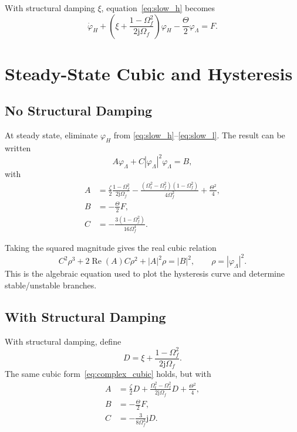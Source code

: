 \documentclass[11pt]{article}
\newcommand{\jj}{\mathrm{j}}
\begin{document}
With structural damping $\xi$, equation~\eqref{eq:slow_h} becomes
\begin{equation}
  \dot\varphi_H
  +\left(\xi+\frac{1-\Omega_f^2}{2\jj\Omega_f}\right)\varphi_H
  -\frac{\Theta}{2}\varphi_\Lambda
  =F.
  \label{eq:slow_h_damped}
\end{equation}

\section{Steady-State Cubic and Hysteresis}

\subsection{No Structural Damping}

At steady state, eliminate $\varphi_H$ from
\eqref{eq:slow_h}--\eqref{eq:slow_l}.  The result can be written
\begin{equation}
  A\varphi_\Lambda+C|\varphi_\Lambda|^2\varphi_\Lambda=B,
  \label{eq:complex_cubic}
\end{equation}
with
\begin{align}
  A
  &=
  \frac{\zeta}{2}\frac{1-\Omega_f^2}{2\jj\Omega_f}
  -\frac{(\Omega_t^2-\Omega_f^2)(1-\Omega_f^2)}{4\Omega_f^2}
  +\frac{\Theta^2}{4},\\
  B&=-\frac{\Theta}{2}F,\\
  C&=-\frac{3(1-\Omega_f^2)}{16\Omega_f^4}.
\end{align}

Taking the squared magnitude gives the real cubic relation
\begin{equation}
  C^2\rho^3
  +2\operatorname{Re}(A)C\rho^2
  +|A|^2\rho
  =
  |B|^2,
  \qquad
  \rho=|\varphi_\Lambda|^2.
  \label{eq:real_cubic}
\end{equation}
This is the algebraic equation used to plot the hysteresis curve and determine
stable/unstable branches.

\subsection{With Structural Damping}

With structural damping, define
\begin{equation}
  D=\xi+\frac{1-\Omega_f^2}{2\jj\Omega_f}.
\end{equation}
The same cubic form~\eqref{eq:complex_cubic} holds, but with
\begin{align}
  A
  &=
  \frac{\zeta}{2}D
  +\frac{\Omega_t^2-\Omega_f^2}{2\jj\Omega_f}D
  +\frac{\Theta^2}{4},\\
  B&=-\frac{\Theta}{2}F,\\
  C&=-\frac{3}{8\Omega_f^3}\jj D.
\end{align}
\end{document}
